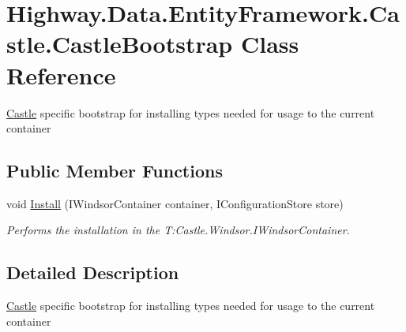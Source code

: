 \hypertarget{class_highway_1_1_data_1_1_entity_framework_1_1_castle_1_1_castle_bootstrap}{\section{Highway.\-Data.\-Entity\-Framework.\-Castle.\-Castle\-Bootstrap Class Reference}
\label{class_highway_1_1_data_1_1_entity_framework_1_1_castle_1_1_castle_bootstrap}
}


\hyperlink{namespace_highway_1_1_data_1_1_entity_framework_1_1_castle}{Castle} specific bootstrap for installing types needed for usage to the current container  


\subsection*{Public Member Functions}
\begin{DoxyCompactItemize}
\item 
void \hyperlink{class_highway_1_1_data_1_1_entity_framework_1_1_castle_1_1_castle_bootstrap_ac7161bb3c873e78b28b4085225c5a776}{Install} (I\-Windsor\-Container container, I\-Configuration\-Store store)
\begin{DoxyCompactList}\small\item\em Performs the installation in the T\-:\-Castle.\-Windsor.\-I\-Windsor\-Container. \end{DoxyCompactList}\end{DoxyCompactItemize}


\subsection{Detailed Description}
\hyperlink{namespace_highway_1_1_data_1_1_entity_framework_1_1_castle}{Castle} specific bootstrap for installing types needed for usage to the current container 



